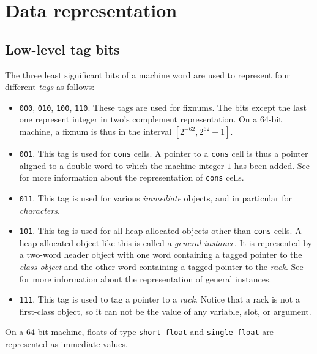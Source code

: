 \chapter{Data representation}
\label{chap-data-representation}

\section{Low-level tag bits}

The three least significant bits of a machine word are used to
represent four different \emph{tags} as follows:

\begin{itemize}
\item \texttt{000}, \texttt{010}, \texttt{100}, \texttt{110}.  These
  tags are used for fixnums.  The bits except the last one represent
  integer in two's complement representation.  On a 64-bit machine, a
  fixnum is thus in the interval $[2^{-62}, 2^{62} - 1]$.
\item \texttt{001}.  This tag is used for \texttt{cons} cells.  A
  pointer to a \texttt{cons} cell is thus a pointer aligned to a
  double word to which the machine integer $1$ has been added.  See
   for more information
  about the representation of \texttt{cons} cells.
\item \texttt{011}.  This tag is used for various \emph{immediate}
  objects, and in particular for \emph{characters}.
\item \texttt{101}.  This tag is used for all heap-allocated
  \commonlisp{} objects other than \texttt{cons} cells.  A heap
  allocated object like this is called a \emph{general instance}.  It
  is represented by a two-word header object with one word containing
  a tagged pointer to the \emph{class object} and the other word
  containing a tagged pointer to the \emph{rack}.  See
   for more
  information about the representation of general instances.
\item \texttt{111}.  This tag is used to tag a pointer to a
  \emph{rack}.  Notice that a rack is not a first-class \commonlisp{}
  object, so it can not be the value of any variable, slot, or
  argument.
\end{itemize}

On a 64-bit machine, floats of type \texttt{short-float} and
\texttt{single-float} are represented as immediate values.

